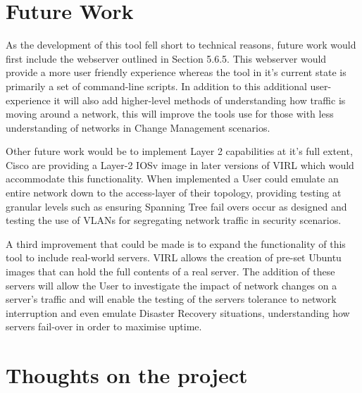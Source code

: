 \documentclass[11pt]{report}
\begin{document}
\section{Future Work}

As the development of this tool fell short to technical reasons, future work would first include the webserver outlined in Section 5.6.5. This webserver would provide a more user friendly experience whereas the tool in it's current state is primarily a set of command-line scripts. In addition to this additional user-experience it will also add higher-level methods of understanding how traffic is moving around a network, this will improve the tools use for those with less understanding of networks in Change Management scenarios.

Other future work would be to implement Layer 2 capabilities at it's full extent, Cisco are providing a Layer-2 IOSv image in later versions of VIRL which would accommodate this functionality. When implemented a User could emulate an entire network down to the access-layer of their topology, providing testing at granular levels such as ensuring Spanning Tree fail overs occur as designed and testing the use of VLANs for segregating network traffic in security scenarios.

A third improvement that could be made is to expand the functionality of this tool to include real-world servers. VIRL allows the creation of pre-set Ubuntu images that can hold the full contents of a real server. The addition of these servers will allow the User to investigate the impact of network changes on a server's traffic and will enable the testing of the servers tolerance to network interruption and even emulate Disaster Recovery situations, understanding how servers fail-over in order to maximise uptime.

\section{Thoughts on the project}
\end{document}
